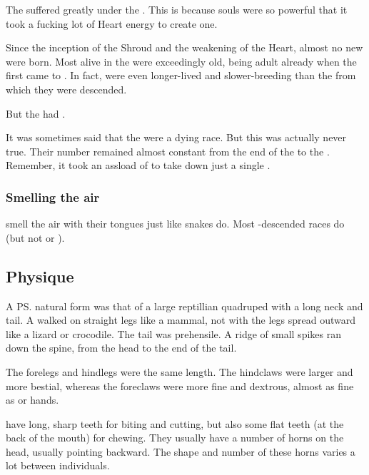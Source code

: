 The \dragons{} suffered greatly under the . 
This is because \draconian{} souls were so powerful that it took a fucking lot of Heart energy to create one. 

Since the inception of the Shroud and the weakening of the Heart, almost no new \dragons were born.
Most \dragons alive in the \thirdbanewar were exceedingly old, being adult already when the first \resphain came to \Miith. 
In fact, \dragons were even longer-lived and slower-breeding than the \ophidians from which they were descended. 

But the  had .

It was sometimes said that the \dragons were a dying race.
But this was actually never true. 
Their number remained almost constant from the end of the \secondbanewar to the \thirdbanewar.
Remember, it took an assload of \resphain to take down just a single \dragon.






\subsubsection{Smelling the air}
\Dragons smell the air with their tongues just like snakes do. 
Most \ophidian-descended races do (but not \scathae or \cregorrs). 









\subsection{Physique}
A \ps{\dragon}{} natural form was that of a large reptillian quadruped with a long neck and tail. 
A \dragon{} walked on straight legs like a mammal, not with the legs spread outward like a lizard or crocodile. 
The tail was prehensile. 
A ridge of small spikes ran down the spine, from the head to the end of the tail. 

The forelegs and hindlegs were the same length. 
The hindclaws were larger and more bestial, whereas the foreclaws were more fine and dextrous, almost as fine as \human or \scatha hands. 

\Dragons{} have long, sharp teeth for biting and cutting, but also some flat teeth (at the back of the mouth) for chewing. 
They usually have a number of horns on the head, usually pointing backward. 
The shape and number of these horns varies a lot between individuals. 

